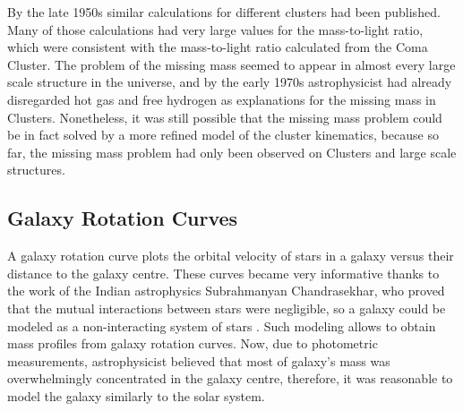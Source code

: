 By the late 1950s similar calculations for different clusters had been published. Many of those calculations had very large values for the mass-to-light ratio\cite{schwarzschildSon}, which were consistent with the mass-to-light ratio calculated from the Coma Cluster. The problem of the missing mass seemed to appear in almost every large scale structure in the universe, and by the early 1970s astrophysicist had already disregarded hot gas\cite{meekins} and free hydrogen\cite{penzias} as explanations for the missing mass in Clusters.
Nonetheless, it was still possible that the missing mass problem could be in fact solved by a more refined model of the cluster kinematics, because so far, the missing mass problem had only been observed on Clusters and large scale structures.

\subsection{Galaxy Rotation Curves}
A galaxy rotation curve plots the orbital velocity of stars in a galaxy versus their distance to the galaxy centre.
These curves became very informative thanks to the work of the Indian astrophysics Subrahmanyan Chandrasekhar, who proved that the mutual interactions between stars were negligible, so a galaxy could be modeled as a non-interacting system of stars \cite{chandrasekhar}. Such modeling allows to obtain mass profiles from galaxy rotation curves.
Now, due to photometric measurements, astrophysicist believed that most of  galaxy's mass was overwhelmingly concentrated in the galaxy centre, therefore, it was reasonable to model the galaxy similarly to the solar system.

